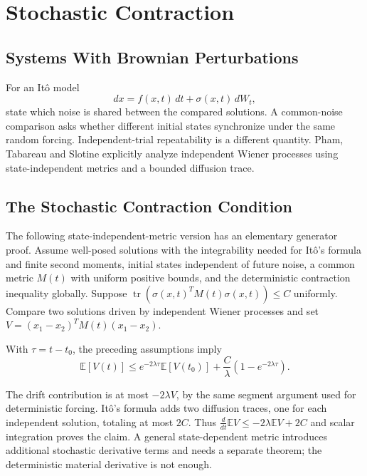 \section{Stochastic Contraction}

\subsection{Systems With Brownian Perturbations}

For an It\^o model
\begin{equation}
dx=f(x,t)\,dt+\sigma(x,t)\,dW_t,
\label{eq:ch4:sde}
\end{equation}
state which noise is shared between the compared solutions. A common-noise comparison asks whether different initial states synchronize under the same random forcing. Independent-trial repeatability is a different quantity. Pham, Tabareau and Slotine \cite{PhamTabuadaSlotine2009} explicitly analyze independent Wiener processes using state-independent metrics and a bounded diffusion trace.

\subsection{The Stochastic Contraction Condition}

The following state-independent-metric version has an elementary generator proof. Assume well-posed solutions with the integrability needed for It\^o's formula and finite second moments, initial states independent of future noise, a common metric $M(t)$ with uniform positive bounds, and the deterministic contraction inequality globally. Suppose
$\operatorname{tr}(\sigma(x,t)^TM(t)\sigma(x,t))\leq C$
uniformly. Compare two solutions driven by independent Wiener processes and set $V=(x_1-x_2)^TM(t)(x_1-x_2)$.

\begin{theorem}
\label{thm:ch4:stochastic-contraction}
With $\tau=t-t_0$, the preceding assumptions imply
\begin{equation}
\mathbb E[V(t)]\leq e^{-2\lambda\tau}\mathbb E[V(t_0)]
+\frac{C}{\lambda}(1-e^{-2\lambda\tau}).
\label{eq:ch4:stochastic-bound}
\end{equation}
\end{theorem}

The drift contribution is at most $-2\lambda V$, by the same segment argument used for deterministic forcing. It\^o's formula adds two diffusion traces, one for each independent solution, totaling at most $2C$. Thus $\frac{d}{dt}\mathbb E V\leq-2\lambda\mathbb E V+2C$ and scalar integration proves the claim. A general state-dependent metric introduces additional stochastic derivative terms and needs a separate theorem; the deterministic material derivative is not enough.

